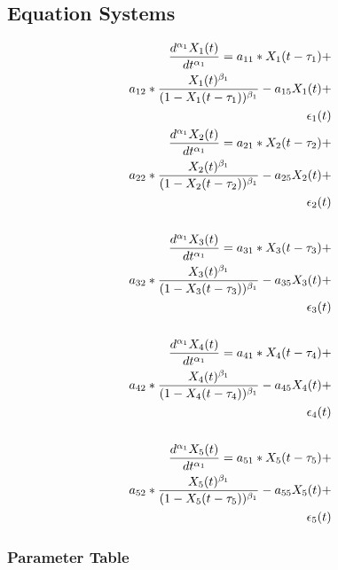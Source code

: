 \subsection{Equation Systems}

\begin{align*} 
\tiny
\frac{d^{\alpha_1}X_1(t)}{dt^{\alpha_1}} = a_{11} *X_1(t - \tau_1) + \\
a_{12} *\frac{X_1(t)^{\beta_1}}{(1-X_1(t - \tau_1))^{\beta_1}} - a_{15}X_1(t) + \\
\epsilon_1(t) \\
\frac{d^{\alpha_1}X_2(t)}{dt^{\alpha_1}} = a_{21} *X_2(t - \tau_2) + \\
a_{22} *\frac{X_2(t)^{\beta_1}}{(1-X_2(t - \tau_2))^{\beta_1}} - a_{25}X_2(t) + \\
\epsilon_2(t) \\ \\
\frac{d^{\alpha_1}X_3(t)}{dt^{\alpha_1}} = a_{31} *X_3(t - \tau_3) + \\
a_{32} *\frac{X_3(t)^{\beta_1}}{(1-X_3(t - \tau_3))^{\beta_1}} - a_{35}X_3(t) + \\
\epsilon_3(t) \\ \\
\frac{d^{\alpha_1}X_4(t)}{dt^{\alpha_1}} = a_{41} *X_4(t - \tau_4) + \\
a_{42} *\frac{X_4(t)^{\beta_1}}{(1-X_4(t - \tau_4))^{\beta_1}} - a_{45}X_4(t) + \\
\epsilon_4(t) \\ \\
\frac{d^{\alpha_1}X_5(t)}{dt^{\alpha_1}} = a_{51} *X_5(t - \tau_5) + \\
a_{52} *\frac{X_5(t)^{\beta_1}}{(1-X_5(t - \tau_5))^{\beta_1}} - a_{55}X_5(t) + \\
\epsilon_5(t) \\
\end{align*}

\subsubsection{Parameter Table}

